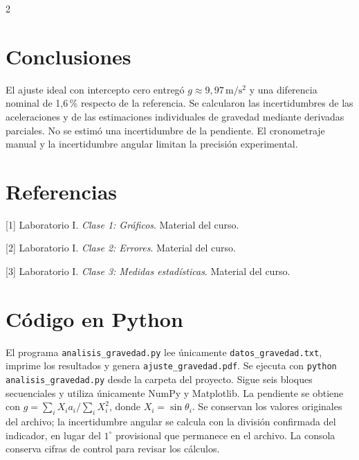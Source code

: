\documentclass[10pt,letterpaper]{article}
\begin{document}
\begin{multicols}{2}
\section{Conclusiones}
El ajuste ideal con intercepto cero entregó $g\approx9{,}97\,\mathrm{m/s^2}$ y una diferencia nominal de 1,6\,\% respecto de la referencia. Se calcularon las incertidumbres de las aceleraciones y de las estimaciones individuales de gravedad mediante derivadas parciales. No se estimó una incertidumbre de la pendiente. El cronometraje manual y la incertidumbre angular limitan la precisión experimental.

\section*{Referencias}
[1] Laboratorio I. \textit{Clase 1: Gráficos}. Material del curso.

[2] Laboratorio I. \textit{Clase 2: Errores}. Material del curso.

[3] Laboratorio I. \textit{Clase 3: Medidas estadísticas}. Material del curso.
\end{multicols}

\clearpage
\appendix
\section{Código en Python}
El programa \nolinkurl{analisis_gravedad.py} lee únicamente \nolinkurl{datos_gravedad.txt}, imprime los resultados y genera \nolinkurl{ajuste_gravedad.pdf}. Se ejecuta con \texttt{python analisis\_gravedad.py} desde la carpeta del proyecto. Sigue seis bloques secuenciales y utiliza únicamente NumPy y Matplotlib. La pendiente se obtiene con $g=\sum_i X_i a_i/\sum_i X_i^2$, donde $X_i=\sin\theta_i$. Se conservan los valores originales del archivo; la incertidumbre angular se calcula con la división confirmada del indicador, en lugar del $1^\circ$ provisional que permanece en el archivo. La consola conserva cifras de control para revisar los cálculos.

\end{document}
